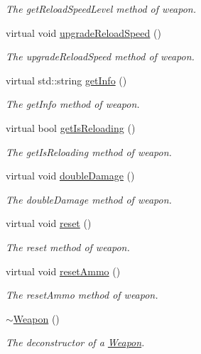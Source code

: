 \begin{DoxyCompactItemize}
\begin{DoxyCompactList}\small\item\em The get\+Reload\+Speed\+Level method of weapon. \end{DoxyCompactList}\item 
virtual void \hyperlink{class_weapon_abd120b07bb75721966026445033d6601}{upgrade\+Reload\+Speed} ()
\begin{DoxyCompactList}\small\item\em The upgrade\+Reload\+Speed method of weapon. \end{DoxyCompactList}\item 
virtual std\+::string \hyperlink{class_weapon_acbb83cac4f5426151954c6d4d5c66230}{get\+Info} ()
\begin{DoxyCompactList}\small\item\em The get\+Info method of weapon. \end{DoxyCompactList}\item 
virtual bool \hyperlink{class_weapon_a8126dd185bfc566566d4e4d5bdfb1f1a}{get\+Is\+Reloading} ()
\begin{DoxyCompactList}\small\item\em The get\+Is\+Reloading method of weapon. \end{DoxyCompactList}\item 
virtual void \hyperlink{class_weapon_a4e416a0635f930a322529af55b69e5ef}{double\+Damage} ()
\begin{DoxyCompactList}\small\item\em The double\+Damage method of weapon. \end{DoxyCompactList}\item 
virtual void \hyperlink{class_weapon_a126b2f1436460fafa591687b04c6b06a}{reset} ()
\begin{DoxyCompactList}\small\item\em The reset method of weapon. \end{DoxyCompactList}\item 
virtual void \hyperlink{class_weapon_a1222b1f67b198fa7f9e97a6b55eb0350}{reset\+Ammo} ()
\begin{DoxyCompactList}\small\item\em The reset\+Ammo method of weapon. \end{DoxyCompactList}\item 
\hypertarget{class_weapon_a420e7ba3d2017e6de3e93eb579cfd3fa}{\hyperlink{class_weapon_a420e7ba3d2017e6de3e93eb579cfd3fa}{$\sim$\+Weapon} ()}\label{class_weapon_a420e7ba3d2017e6de3e93eb579cfd3fa}

\begin{DoxyCompactList}\small\item\em The deconstructor of a \hyperlink{class_weapon}{Weapon}. \end{DoxyCompactList}\end{DoxyCompactItemize}
